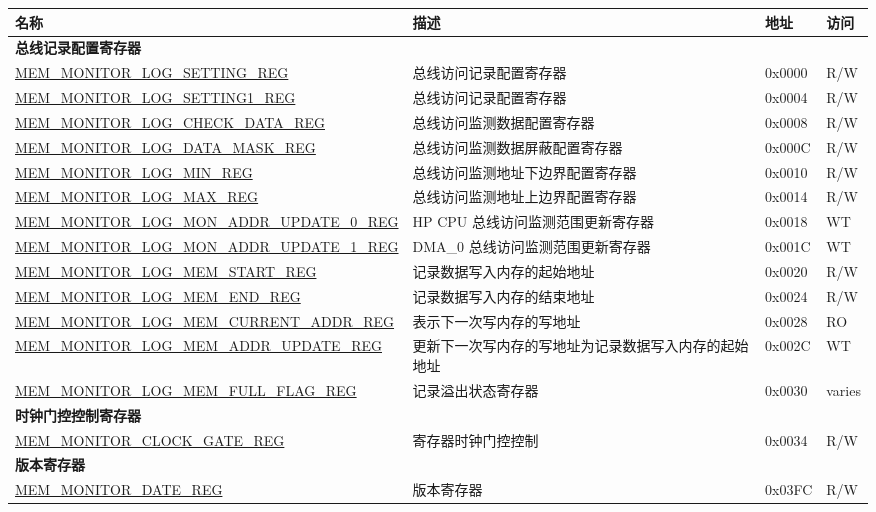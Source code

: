 \begin{longtable}{ | l| m{10cm} | l | l | }
\hline\rowcolor{lightgray}
{\bfseries 名称} & {\bfseries 描述} &  {\bfseries 地址} & {\bfseries 访问} \\ \hline
\endhead
\multicolumn{4}{|l|}{\textbf{总线记录配置寄存器}} \\ \hline
\hyperref[regdesc:MEMMONITORLOGSETTINGREG]{MEM\_MONITOR\_LOG\_SETTING\_REG} & 总线访问记录配置寄存器 & 0x0000 & R/W \\ \hline
\hyperref[regdesc:MEMMONITORLOGSETTING1REG]{MEM\_MONITOR\_LOG\_SETTING1\_REG} & 总线访问记录配置寄存器 & 0x0004 & R/W \\ \hline
\hyperref[regdesc:MEMMONITORLOGCHECKDATAREG]{MEM\_MONITOR\_LOG\_CHECK\_DATA\_REG} & 总线访问监测数据配置寄存器 & 0x0008 & R/W \\ \hline
\hyperref[regdesc:MEMMONITORLOGDATAMASKREG]{MEM\_MONITOR\_LOG\_DATA\_MASK\_REG} & 总线访问监测数据屏蔽配置寄存器 & 0x000C & R/W \\ \hline
\hyperref[regdesc:MEMMONITORLOGMINREG]{MEM\_MONITOR\_LOG\_MIN\_REG} & 总线访问监测地址下边界配置寄存器 & 0x0010 & R/W \\ \hline
\hyperref[regdesc:MEMMONITORLOGMAXREG]{MEM\_MONITOR\_LOG\_MAX\_REG} & 总线访问监测地址上边界配置寄存器 & 0x0014 & R/W \\ \hline
\hyperref[regdesc:MEMMONITORLOGMONADDRUPDATE0REG]{MEM\_MONITOR\_LOG\_MON\_ADDR\_UPDATE\_0\_REG} & HP CPU 总线访问监测范围更新寄存器 & 0x0018 & WT \\ \hline
\hyperref[regdesc:MEMMONITORLOGMONADDRUPDATE1REG]{MEM\_MONITOR\_LOG\_MON\_ADDR\_UPDATE\_1\_REG} & DMA\_0 总线访问监测范围更新寄存器 & 0x001C & WT \\ \hline
\hyperref[regdesc:MEMMONITORLOGMEMSTARTREG]{MEM\_MONITOR\_LOG\_MEM\_START\_REG} & 记录数据写入内存的起始地址 & 0x0020 & R/W \\ \hline
\hyperref[regdesc:MEMMONITORLOGMEMENDREG]{MEM\_MONITOR\_LOG\_MEM\_END\_REG} & 记录数据写入内存的结束地址 & 0x0024 & R/W \\ \hline
\hyperref[regdesc:MEMMONITORLOGMEMCURRENTADDRREG]{MEM\_MONITOR\_LOG\_MEM\_CURRENT\_ADDR\_REG} & 表示下一次写内存的写地址 & 0x0028 & RO \\ \hline
\hyperref[regdesc:MEMMONITORLOGMEMADDRUPDATEREG]{MEM\_MONITOR\_LOG\_MEM\_ADDR\_UPDATE\_REG} & 更新下一次写内存的写地址为记录数据写入内存的起始地址 & 0x002C & WT \\ \hline
\hyperref[regdesc:MEMMONITORLOGMEMFULLFLAGREG]{MEM\_MONITOR\_LOG\_MEM\_FULL\_FLAG\_REG} & 记录溢出状态寄存器 & 0x0030 & varies \\ \hline
\multicolumn{4}{|l|}{\textbf{时钟门控控制寄存器}} \\ \hline
\hyperref[regdesc:MEMMONITORCLOCKGATEREG]{MEM\_MONITOR\_CLOCK\_GATE\_REG} & 寄存器时钟门控控制 & 0x0034 & R/W \\ \hline
\multicolumn{4}{|l|}{\textbf{版本寄存器}} \\ \hline
\hyperref[regdesc:MEMMONITORDATEREG]{MEM\_MONITOR\_DATE\_REG} & 版本寄存器 & 0x03FC & R/W \\ \hline
\end{longtable}
